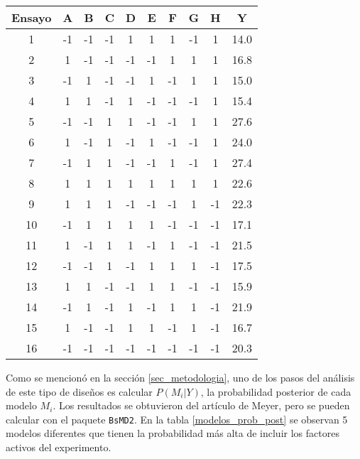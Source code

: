 \begin{center}
	\begin{tabular}{c|cccccccc|c}
		Ensayo & A & B & C & D & E & F & G & H & Y \\
		\hline
		1 & -1 & -1 & -1 & 1 & 1 & 1 & -1 & 1 & 14.0 \\
		
		2 & 1 & -1 & -1 & -1 & -1 & 1 & 1 & 1 & 16.8 \\
		
		3 & -1 & 1 & -1 & -1 & 1 & -1 & 1 & 1 & 15.0 \\
		
		4 & 1 & 1 & -1 & 1 & -1 & -1 & -1 & 1 & 15.4 \\
		
		5 & -1 & -1 & 1 & 1 & -1 & -1 & 1 & 1 & 27.6 \\
		
		6 & 1 & -1 & 1 & -1 & 1 & -1 & -1 & 1 & 24.0 \\
		
		7 & -1 & 1 & 1 & -1 & -1 & 1 & -1 & 1 & 27.4 \\
		
		8 & 1 & 1 & 1 & 1 & 1 & 1 & 1 & 1 & 22.6 \\
		
		9 & 1 & 1 & 1 & -1 & -1 & -1 & 1 & -1 & 22.3 \\
		
		10 & -1 & 1 & 1 & 1 & 1 & -1 & -1 & -1 & 17.1 \\
		
		11 & 1 & -1 & 1 & 1 & -1 & 1 & -1 & -1 & 21.5 \\
		
		12 & -1 & -1 & 1 & -1 & 1 & 1 & 1 & -1 & 17.5 \\
		
		13 & 1 & 1 & -1 & -1 & 1 & 1 & -1 & -1 & 15.9 \\
		
		14 & -1 & 1 & -1 & 1 & -1 & 1 & 1 & -1 & 21.9 \\
		
		15 & 1 & -1 & -1 & 1 & 1 & -1 & 1 & -1 & 16.7 \\
		
		16 & -1 & -1 & -1 & -1 & -1 & -1 & -1 & -1 & 20.3 \\
		
	\end{tabular}
	 \label{data_table1}
\end{center}

Como se mencionó en la sección \ref{sec_metodologia}, uno de los pasos del análisis de este tipo de diseños es calcular $P(M_i | Y)$, la probabilidad posterior de cada modelo $M_i$. Los resultados se obtuvieron del artículo de Meyer, pero se pueden calcular con el paquete \texttt{BsMD2}. En la tabla \ref{modelos_prob_post} se observan 5 modelos diferentes que tienen la probabilidad más alta de incluir los factores activos del experimento. 

